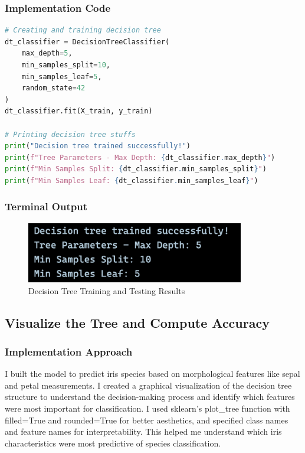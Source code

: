 \documentclass[12pt,a4paper]{article}
\begin{document}
\subsubsection{Implementation Code}
\begin{lstlisting}[language=Python, caption=Train/Test a Decision Tree on a Labelled Dataset]
# Creating and training decision tree 
dt_classifier = DecisionTreeClassifier(
    max_depth=5,
    min_samples_split=10,
    min_samples_leaf=5,
    random_state=42
)
dt_classifier.fit(X_train, y_train)

# Printing decision tree stuffs
print("Decision tree trained successfully!")
print(f"Tree Parameters - Max Depth: {dt_classifier.max_depth}")
print(f"Min Samples Split: {dt_classifier.min_samples_split}")
print(f"Min Samples Leaf: {dt_classifier.min_samples_leaf}")
\end{lstlisting}

\subsubsection{Terminal Output}

\begin{figure}[h!]
    \centering
    \includegraphics[width=0.85\textwidth]{Figures/training.png}
    \caption{Decision Tree Training and Testing Results}
\end{figure}

\newpage
\subsection{Visualize the Tree and Compute Accuracy}

\subsubsection{Implementation Approach}
I built the model to predict iris species based on morphological features like sepal and petal measurements. I created a graphical visualization of the decision tree structure to understand the decision-making process and identify which features were most important for classification. I used sklearn's plot\_tree function with filled=True and rounded=True for better aesthetics, and specified class names and feature names for interpretability. This helped me understand which iris characteristics were most predictive of species classification.
\end{document}
